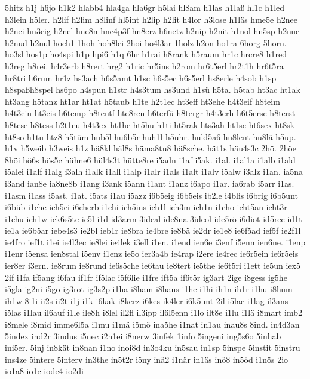 {5hitz h1j h6jo h1k2 hlabb4 hla4ga hla6gr h5lai hl8am h1las h1la\ss
 hl1c h1led h3lein h5ler.  h2lif h2lim h8linf hl5int h2lip
h2lit h4lor h3lose h1l\"as hme5e h2nee h2nei hn3eig h2nel hne8n
hne4p3f hn8erz h6netz h2nip h2nit h1nol hn5sp h2nuc h2nud h2nul hoch1
1hoh hoh8lei 2hoi ho4l3ar 1holz h2on ho1ra 6horg 5horn.  ho3sl hos1p
ho4spi h1p hpi6 h1q 6hr h1rai h8rank h5raum hr1c hrcre8 h1red h3reg
h8rei.  h4r3erb h8rert hrg2 h1ric hr5ins h2rom hr6t5erl hr2t1h hr6t5ra
hr8tri h6rum hr1z hs3ach h6s5amt h1sc h6s5ec h6s5erl hs8erle h4sob
h1sp h8spa\ss  h8spel hs6po h4spun h1str h4s3tum hs3und
h1s\"u h5ta.  h5tab ht3ac ht1ak ht3ang h5tanz ht1ar ht1at h5taub
h1te h2t1ec ht3eff ht3ehe h4t3eif h8teim h4t3ein ht3eis h6temp h8tentf
hte8ren h6terf\"u h8tergr h4t3erh h6t5ersc h8terst h8tese h8tess
h2t1eu h4t3ex ht1he ht5hu h1ti ht5rak hts3ah ht1sc ht6sex ht8sk ht8so
h1tu htz8 h5t\"um hub5l hu6b5r huh1l h5uhr.  huld5a6 hu8lent
hu8l\"a h5up.  h1v h5weib h3weis h1z h\"a8kl h\"al8s
h\"ama8tu8 h\"a8sche. h\"at1s h\"au4s3c 2h\"o.
2h\"oe 8h\"oi h\"o6s h\"os5c h\"uhne6 h\"ul4s3t
h\"utte8re i5adn i1af i5ak.  i1al.  i1al1a i1alb i1ald i5alei i1alf
i1alg i3alh i1alk i1all i1alp i1alr i1als i1alt i1alv i5alw i3alz
i1an.  ia5na i3and ian8e ia8ne8b i1ang i3ank i5ann i1ant i1anz i6apo
i1ar.  ia6rab i5arr i1as.  i1asm i1ass i5ast.  i1at.  i5ats i1au i5azz
i6b5eig i6b5eis ib2le i4blis i6brig i6b5unt i6b\"ub i1che ich5ei
i6cherb i1chi ich5ins ich1l ich3m ich1n i1cho icht5an icht3r i1chu
ich1w ick6s5te ic5l i1d id3arm 3ideal ide8na 3ideol ide5r\"o i6diot
id5rec id1t ie1a ie6b5ar iebe4s3 ie2bl ieb1r ie8bra ie4bre ie8b\"a
ie2dr ie1e8 ie6f5ad ief5f ie2f1l ie4fro ief1t i1ei ie4l3ec ie8lei
ie4lek i3ell i1en.  i1end ien6e i3enf i5enn ien6ne.  i1enp i1enr
i5ensa ien8stal i5env i1enz ie5o ier3a4b ie4rap i2ere ie4rec ie6r5ein
ie6r5eis ier8er i3ern.  ie8rum ie8rund ie6s5che ie6tau ie8tert ie5the
ie6t5ri i1ett ie5un iex5 2if i1fa if5ang i6fau if1fr if5lac i5f6lie
i1fre ift5a if6t5r ig3art 2ige i8gess ig5he i5gla ig2ni i5go ig3rot
ig3s2p i1ha i8ham i8hans i1he i1hi ih1n ih1r i1hu i8hum ih1w 8i1i ii2s
ii2t i1j i1k i6kak i8kerz i6kes ik4ler i6k5unt 2il i5lac i1lag il3ans
i5las i1lau il6auf i1le ile8h i8lel il2fl il3ipp il6l5enn i1lo ilt8e
i1lu i1l\"a i8mart imb2 i8mele i8mid imme6l5a i1mu i1m\"a
i5m\"o ina5he i1nat in1au inau8s 8ind.  in4d3an 5index ind2r 3indus
i5nec i2n1ei i8nerw 3infek 1info 5ingeni ing5s6o 5inhab ini5er.  5inj
in8k\"at in8nan i1no inoi8d in3o4ku in5sau in1sp 5inspe 5instit
5instru ins4ze 5intere 5interv in3the in5t2r i5ny in\"a2 i1n\"ar
in1\"as in\"o8 in5\"od i1n\"os 2io io1a8 io1c iode4 io2di
}
